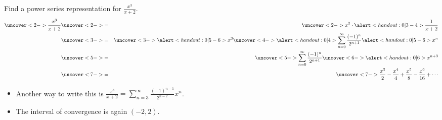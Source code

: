 \begin{frame}
\begin{example} %
Find a power series representation for $\frac{x^3}{x+2}$.
\abovedisplayskip=0pt
\belowdisplayskip=0pt
\begin{eqnarray*}
\uncover<2->{%
\frac{x^3}{x+2}%
}%
 & \uncover<2->{ = } &%
\uncover<2->{%
x^3 \cdot \alert<handout:0| 3-4>{\frac{1}{x+2}}%
}\\%
& \uncover<3->{ = } &%
\uncover<3->{%
\alert<handout:0| 5-6>{x^3} \uncover<4->{\alert<handout:0| 4>{\sum_{n=0}^\infty \frac{(-1)^n}{2^{n+1}}\alert<handout:0| 5-6>{x^n}}}%
}\\%
 & \uncover<5->{ = } &%
\uncover<5->{%
\sum_{n=0}^\infty \frac{(-1)^n}{2^{n+1}} \uncover<6->{\alert<handout:0| 6>{x^{n+3}}}%
}\\%
 & \uncover<7->{ = } &%
\uncover<7->{%
\frac{x^3}{2} - \frac{x^4}{4} + \frac{x^5}{8} - \frac{x^6}{16} + \cdots%
}%
\end{eqnarray*}
\begin{itemize}
\item<8->  Another way to write this is $\frac{x^3}{x+2} = \sum_{n=3}^\infty \frac{(-1)^{n-1}}{2^{n-2}}x^n$.
\item<9->  The interval of convergence is again $(-2, 2)$.
\end{itemize}
\end{example}
\end{frame}
